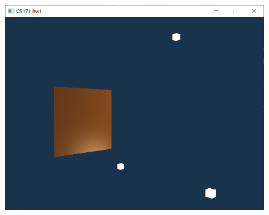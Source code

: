\documentclass[acmtog]{acmart}
\begin{document}
\begin{figure}[h]
		\\
		\begin{minipage}[b]{.4\linewidth}
			\includegraphics[scale=0.25]{plane.png}
		\end{minipage}
	\end{figure}
\end{document}
